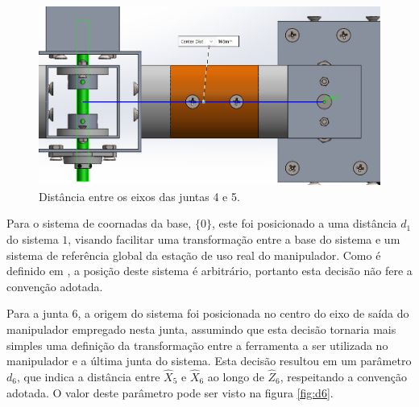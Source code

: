 \begin{figure}[ht]
    \caption{Distância entre os eixos das juntas 4 e 5.}    
    \begin{centering}

        \includegraphics[width=0.9\columnwidth]{adendo/images/a4.png}
    
    \par\end{centering}

    \label{fig:a4}
\end{figure}

Para o sistema de coornadas da base, $\{0\}$, este foi posicionado a uma distância $d_1$ do sistema ${1}$, 
visando facilitar uma transformação entre a base do sistema e um sistema de referência global
da estação de uso real do manipulador. 
Como é definido em \cite{craig2009introduction}, a posição deste sistema é arbitrário, portanto
esta decisão não fere a convenção adotada.

\newpage

Para a junta 6, a origem do sistema foi posicionada no centro do eixo de saída do manipulador empregado nesta 
junta, assumindo que esta decisão tornaria mais simples uma definição da transformação entre a ferramenta a 
ser utilizada no manipulador e a última junta do sistema. Esta decisão resultou em um parâmetro $d_6$, que 
indica a distância entre $\hat{X}_5$ e $\hat{X}_6$ ao longo de $\hat{Z}_6$, respeitando a convenção adotada.
O valor deste parâmetro pode ser visto na figura \ref{fig:d6}.

